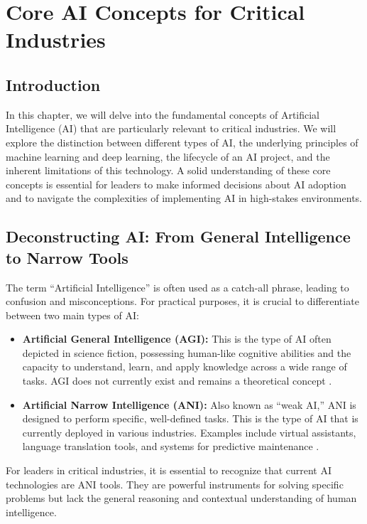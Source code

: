 \chapter{Core AI Concepts for Critical Industries}
\label{chap:core_ai_concepts_for_critical_industries}

\section{Introduction}
\label{sec:core_ai_introduction}
In this chapter, we will delve into the fundamental concepts of Artificial Intelligence (AI) that are particularly relevant to critical industries. We will explore the distinction between different types of AI, the underlying principles of machine learning and deep learning, the lifecycle of an AI project, and the inherent limitations of this technology. A solid understanding of these core concepts is essential for leaders to make informed decisions about AI adoption and to navigate the complexities of implementing AI in high-stakes environments.

\section{Deconstructing AI: From General Intelligence to Narrow Tools}
\label{sec:deconstructing_ai}
The term ``Artificial Intelligence'' is often used as a catch-all phrase, leading to confusion and misconceptions. For practical purposes, it is crucial to differentiate between two main types of AI:

\begin{itemize}
    \item \textbf{Artificial General Intelligence (AGI):} This is the type of AI often depicted in science fiction, possessing human-like cognitive abilities and the capacity to understand, learn, and apply knowledge across a wide range of tasks. AGI does not currently exist and remains a theoretical concept \parencite{Bostrom2014}.
    \item \textbf{Artificial Narrow Intelligence (ANI):} Also known as ``weak AI,'' ANI is designed to perform specific, well-defined tasks. This is the type of AI that is currently deployed in various industries. Examples include virtual assistants, language translation tools, and systems for predictive maintenance \parencite{Goodfellow-et-al-2016}.
\end{itemize}

For leaders in critical industries, it is essential to recognize that current AI technologies are ANI tools. They are powerful instruments for solving specific problems but lack the general reasoning and contextual understanding of human intelligence.

